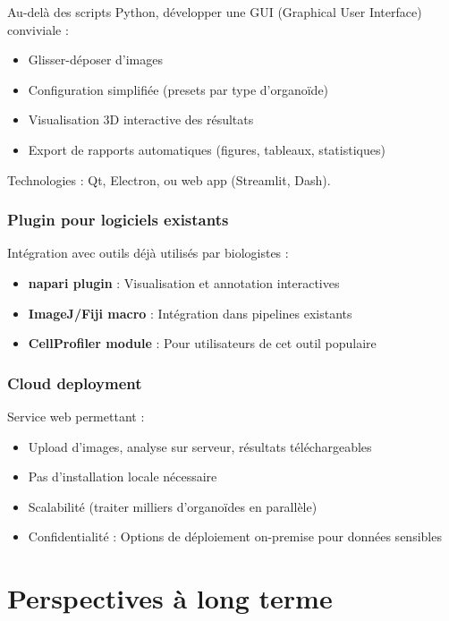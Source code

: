 Au-delà des scripts Python, développer une GUI (Graphical User Interface) conviviale :
\begin{itemize}
    \item Glisser-déposer d'images
    \item Configuration simplifiée (presets par type d'organoïde)
    \item Visualisation 3D interactive des résultats
    \item Export de rapports automatiques (figures, tableaux, statistiques)
\end{itemize}

Technologies : Qt, Electron, ou web app (Streamlit, Dash).

\subsubsection{Plugin pour logiciels existants}

Intégration avec outils déjà utilisés par biologistes :
\begin{itemize}
    \item \textbf{napari plugin} : Visualisation et annotation interactives
    \item \textbf{ImageJ/Fiji macro} : Intégration dans pipelines existants
    \item \textbf{CellProfiler module} : Pour utilisateurs de cet outil populaire
\end{itemize}

\subsubsection{Cloud deployment}

Service web permettant :
\begin{itemize}
    \item Upload d'images, analyse sur serveur, résultats téléchargeables
    \item Pas d'installation locale nécessaire
    \item Scalabilité (traiter milliers d'organoïdes en parallèle)
    \item Confidentialité : Options de déploiement on-premise pour données sensibles
\end{itemize}

\section{Perspectives à long terme}

